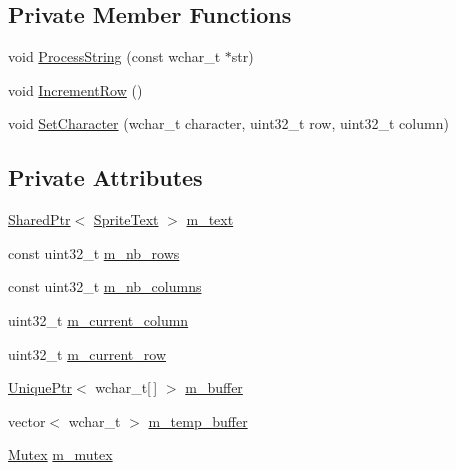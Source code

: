 \subsection*{Private Member Functions}
\begin{DoxyCompactItemize}
\item 
void \hyperlink{classmage_1_1_text_console_script_ac1e1d4768ead2de82493ab487449bbd8}{Process\+String} (const wchar\+\_\+t $\ast$str)
\item 
void \hyperlink{classmage_1_1_text_console_script_a0e82c5d5b84499bf4ed2233cf26145fa}{Increment\+Row} ()
\item 
void \hyperlink{classmage_1_1_text_console_script_a08324571bfbe793eafedc22126e575b9}{Set\+Character} (wchar\+\_\+t character, uint32\+\_\+t row, uint32\+\_\+t column)
\end{DoxyCompactItemize}
\subsection*{Private Attributes}
\begin{DoxyCompactItemize}
\item 
\hyperlink{namespacemage_a1e01ae66713838a7a67d30e44c67703e}{Shared\+Ptr}$<$ \hyperlink{classmage_1_1_sprite_text}{Sprite\+Text} $>$ \hyperlink{classmage_1_1_text_console_script_a761287353d8f9b031beb890c9f6c7203}{m\+\_\+text}
\item 
const uint32\+\_\+t \hyperlink{classmage_1_1_text_console_script_ac2e2d9630355f22945259d5a0af135ef}{m\+\_\+nb\+\_\+rows}
\item 
const uint32\+\_\+t \hyperlink{classmage_1_1_text_console_script_a6a4f3fdc2fb4be3c01e83363c5d7f631}{m\+\_\+nb\+\_\+columns}
\item 
uint32\+\_\+t \hyperlink{classmage_1_1_text_console_script_ac08f796712a2dc5d6e78a3f558272dff}{m\+\_\+current\+\_\+column}
\item 
uint32\+\_\+t \hyperlink{classmage_1_1_text_console_script_aedb5aebdee16791c69e0143525ee9d10}{m\+\_\+current\+\_\+row}
\item 
\hyperlink{namespacemage_a3316d7143a973e37adf1110f2e80ca31}{Unique\+Ptr}$<$ wchar\+\_\+t\mbox{[}$\,$\mbox{]} $>$ \hyperlink{classmage_1_1_text_console_script_a526410b1b43646948809b772c5446346}{m\+\_\+buffer}
\item 
vector$<$ wchar\+\_\+t $>$ \hyperlink{classmage_1_1_text_console_script_a6500bfd006f5c90d05f3da7f3e8e75a8}{m\+\_\+temp\+\_\+buffer}
\item 
\hyperlink{structmage_1_1_mutex}{Mutex} \hyperlink{classmage_1_1_text_console_script_a7212b01c007fc3d2fd11620c570f1c55}{m\+\_\+mutex}
\end{DoxyCompactItemize}
